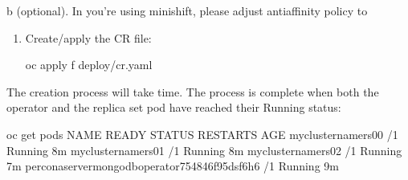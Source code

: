 \documentclass[letterpaper,10pt,english]{sphinxmanual}
\begin{document}
\begin{enumerate}
\begin{enumerate}
\begin{sphinxVerbatim}[commandchars=\\\{\}]
 
 
   
   
\end{sphinxVerbatim}

\end{enumerate}

b (optional). In you’re using minishift, please adjust antiaffinity policy to 
\begin{quote}

\begin{sphinxVerbatim}[commandchars=\\\{\}]
      
\end{sphinxVerbatim}
\end{quote}
\begin{enumerate}
%
\setcounter{enumii}{2}
\item {} 
Create/apply the CR file:

\begin{sphinxVerbatim}[commandchars=\\\{\}]
\PYGZdl{} oc apply \PYGZhy{}f deploy/cr.yaml
\end{sphinxVerbatim}

\end{enumerate}

The creation process will take time. The process is complete when both the
operator and the replica set pod have reached their Running status:

\begin{sphinxVerbatim}[commandchars=\\\{\}]
\PYGZdl{} oc get pods
NAME                                               READY   STATUS    RESTARTS   AGE
my\PYGZhy{}cluster\PYGZhy{}name\PYGZhy{}rs0\PYGZhy{}0                              /1     Running             8m
my\PYGZhy{}cluster\PYGZhy{}name\PYGZhy{}rs0\PYGZhy{}1                              /1     Running             8m
my\PYGZhy{}cluster\PYGZhy{}name\PYGZhy{}rs0\PYGZhy{}2                              /1     Running             7m
percona\PYGZhy{}server\PYGZhy{}mongodb\PYGZhy{}operator\PYGZhy{}754846f95d\PYGZhy{}sf6h6   /1     Running             9m
\end{sphinxVerbatim}


\end{enumerate}
\end{document}
